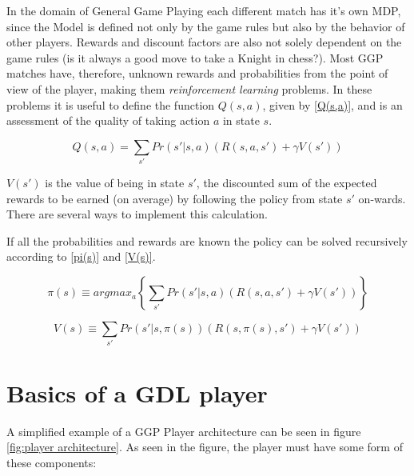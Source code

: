 In the domain of General Game Playing each different match has it's own \gls{MDP}, since the Model is defined not only by the game rules but also by the behavior of other players. Rewards and discount factors are also not solely dependent on the game rules (is it always a good move to take a Knight in chess?). 
Most GGP matches have, therefore, unknown rewards and probabilities from the point of view of the player, making them \textit{reinforcement learning} problems. In these problems it is useful to define the function $Q(s,a)$, given by \ref{Q(s,a)}, and is an assessment of the quality of taking action $a$ in state $s$.

\begin{center}
\begin{equation} \label{Q(s,a)}
Q(s,a) = \sum_{s'} Pr(s' | s, a)(R(s, a, s') + \gamma V(s'))
\end{equation}
\end{center}

$V(s')$ is the value of being in state $s'$, the discounted sum of the expected rewards to be earned (on average) by following the policy from state $s'$ on-wards. There are several ways to implement this calculation.

If all the probabilities and rewards are known the policy can be solved recursively according to \ref{pi(s)} and \ref{V(s)}.

\begin{center}
\begin{equation} \label{pi(s)}
\pi(s) \equiv arg max_{a}\left \{ \sum_{s'} Pr(s' | s, a)(R(s, a, s') + \gamma V(s'))\right \}
\end{equation}
\end{center}

\begin{center}
\begin{equation} \label{V(s)}
V(s) \equiv \sum_{s'} Pr(s' | s, \pi(s))(R(s, \pi(s), s') + \gamma V(s'))
\end{equation}
\end{center}

\section{Basics of a GDL player}

A simplified example of a GGP Player architecture can be seen in figure \ref{fig:player architecture}. As seen in the figure, the player must have some form of these components:


